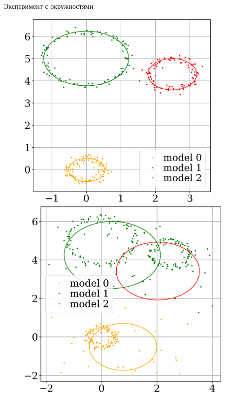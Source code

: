 \documentclass[10pt,pdf,hyperref={unicode}]{beamer}
\begin{document}
\begin{frame}{Эксперимент с окружностями}
\begin{figure}[h!]
\begin{minipage}{.25\textwidth}
\end{minipage}
\begin{minipage}{.25\textwidth}
\hspace{0.3mm}
      \includegraphics[width =  0.9\textwidth]{figures/911.eps}
\end{minipage}
\begin{minipage}{.25\textwidth}
\hspace{-3.3mm}
      \includegraphics[width =  0.95\textwidth]{figures/912.eps}
\end{minipage}
\end{figure}


\end{frame}
\end{document}
